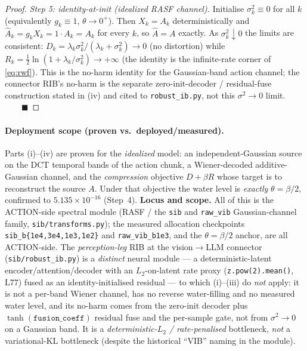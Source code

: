 \begin{proof}
\medskip
\noindent\emph{Step 5: identity-at-init (idealized RASF channel).}
Initialise $\sigma_k^2\equiv0$ for all $k$ (equivalently $g_k\equiv1$, $\theta\to0^+$). Then $X_k=A_k$ deterministically and $\hat A_k=g_kX_k=1\cdot A_k=A_k$ for every $k$, so $\hat A=A$ exactly. As $\sigma_k^2\downarrow0$ the limits are consistent: $D_k=\lambda_k\sigma_k^2/(\lambda_k+\sigma_k^2)\to0$ (no distortion) while $R_k=\tfrac12\ln(1+\lambda_k/\sigma_k^2)\to+\infty$ (the identity is the infinite-rate corner of \eqref{eq:rwf}). This is the no-harm identity for the Gaussian-band action channel; the connector RIB's no-harm is the separate zero-init-decoder / residual-fuse construction stated in (iv) and cited to \texttt{robust\_ib.py}, not this $\sigma^2\!\to\!0$ limit. $\qquad\blacksquare$
\end{proof}

\paragraph{Deployment scope (proven vs.\ deployed/measured).}
Parts (i)--(iv) are proven for the \emph{idealized} model: an independent-Gaussian source on the DCT temporal bands of the action chunk, a Wiener-decoded additive-Gaussian channel, and the \emph{compression} objective $D+\beta R$ whose target is to reconstruct the source $A$. Under that objective the water level is \emph{exactly} $\theta=\beta/2$, confirmed to $5.135\times10^{-16}$ (Step~4). \textbf{Locus and scope.} All of this is the ACTION-side spectral module (RASF / the \texttt{sib} and \texttt{raw\_vib} Gaussian-channel family, \texttt{sib/transforms.py}); the measured allocation checkpoints \texttt{sib\_b\{1e\text{-}4,3e\text{-}4,1e\text{-}3,1e\text{-}2\}} and \texttt{raw\_vib\_b1e\text{-}3}, and the $\theta=\beta/2$ anchor, are all ACTION-side. The \emph{perception-leg} RIB at the vision$\to$LLM connector (\texttt{sib/robust\_ib.py}) is a \emph{distinct} neural module --- a deterministic-latent encoder/attention/decoder with an $L_2$-on-latent rate proxy (\texttt{z.pow(2).mean()}, L77) fused as an identity-initialised residual --- to which (i)--(iii) do \emph{not} apply: it is not a per-band Wiener channel, has no reverse water-filling and no measured water level, and its no-harm comes from the zero-init decoder plus $\tanh(\texttt{fusion\_coeff})$ residual fuse and the per-sample gate, not from $\sigma^2\!\to\!0$ on a Gaussian band. It is a \emph{deterministic-$L_2$ / rate-penalised} bottleneck, \emph{not} a variational-KL bottleneck (despite the historical ``VIB'' naming in the module).

